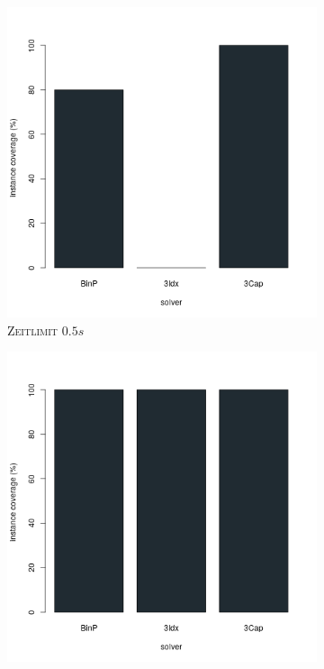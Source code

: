\begin{figure}[H]
\centering

\begin{subfigure}[b]{0.3\textwidth}
\centering
\includegraphics[width=1.1\textwidth]{img/solver_instance_coverage_b=3_s_0_5s.png}
\caption{\textsc{Zeitlimit} $0.5s$}
\label{fig:instance_coverage_b=3_s_a}
\end{subfigure}
\hfill
\begin{subfigure}[b]{0.3\textwidth}
\centering
\includegraphics[width=1.1\textwidth]{img/solver_instance_coverage_b=3_s_1s.png}

\end{subfigure}
\end{figure}
